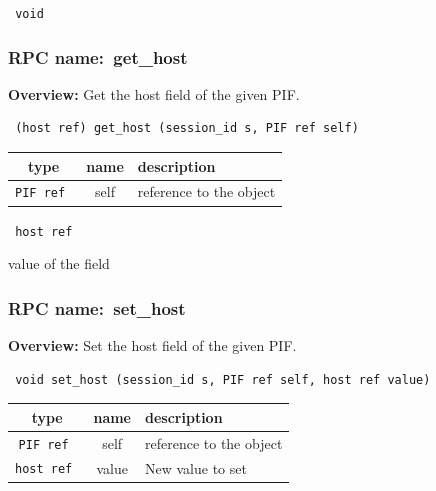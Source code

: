 \vspace{0.3cm}

{\tt 
void
}



\vspace{0.3cm}
\vspace{0.3cm}
\vspace{0.3cm}
\subsubsection{RPC name:~get\_host}

{\bf Overview:} 
Get the host field of the given PIF.

\begin{verbatim} (host ref) get_host (session_id s, PIF ref self)\end{verbatim}



 
\vspace{0.3cm}
\begin{tabular}{|c|c|p{7cm}|}
 \hline
{\bf type} & {\bf name} & {\bf description} \\ \hline
{\tt PIF ref } & self & reference to the object \\ \hline 

\end{tabular}

\vspace{0.3cm}

{\tt 
host ref
}


value of the field
\vspace{0.3cm}
\vspace{0.3cm}
\vspace{0.3cm}
\subsubsection{RPC name:~set\_host}

{\bf Overview:} 
Set the host field of the given PIF.

\begin{verbatim} void set_host (session_id s, PIF ref self, host ref value)\end{verbatim}



 
\vspace{0.3cm}
\begin{tabular}{|c|c|p{7cm}|}
 \hline
{\bf type} & {\bf name} & {\bf description} \\ \hline
{\tt PIF ref } & self & reference to the object \\ \hline 

{\tt host ref } & value & New value to set \\ \hline 

\end{tabular}


